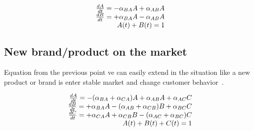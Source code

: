 \begin{equation} \label{eq:10}
\begin{array}{r@{}l}
\frac{dA}{dt} = -\alpha_{BA}A + \alpha_{AB}A \\
\frac{dB}{dt} = +\alpha_{BA}A - \alpha_{AB}A \\
A(t) + B(t) = 1
\end{array}
\end{equation}

\subsection{New brand/product on the market} \label{subsec:newbrand}
Equation from the previous point ve can easily extend in the situation like a new product or brand is enter
stable market and change customer behavior~\cite{patel}.

\begin{equation} \label{eq:11}
\begin{array}{r@{}l}
\frac{dA}{dt} = -(\alpha_{BA}+ \alpha_{CA})A + \alpha_{AB}A + \alpha_{AC}C \\
\frac{dB}{dt} = +\alpha_{BA}A - (\alpha_{AB} + \alpha_{CB})B + \alpha_{BC}C \\
\frac{dC}{dt} = +\alpha_{CA}A + \alpha_{CB}B - (\alpha_{AC} + \alpha_{BC})C \\
A(t) + B(t) + C(t) = 1
\end{array}
\end{equation}

